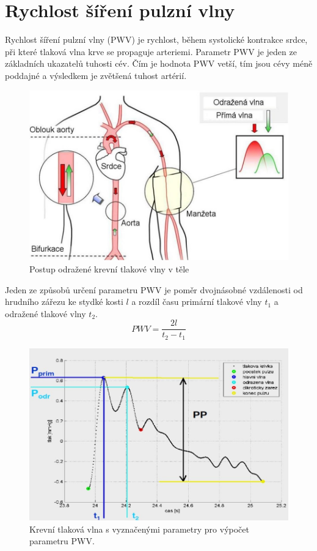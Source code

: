 \section{Rychlost šíření pulzní vlny}
Rychlost šíření pulzní vlny (PWV) je rychlost, během systolické kontrakce srdce, při které tlaková vlna krve se propaguje arteriemi. Parametr PWV je jeden ze základních ukazatelů tuhosti cév.
Čím je hodnota PWV vetší, tím jsou cévy méně poddajné a výsledkem je zvětšená tuhost artérií.\cite{cite:6}
\begin{figure}[H]
    \caption{Postup odražené krevní tlakové vlny v těle \cite{cite:5}}
    \includegraphics[width=1\textwidth]{pictures/pwv_body.jpg}
\end{figure}
Jeden ze způsobů určení parametru PWV je poměr dvojnásobné vzdálenosti od hrudního zářezu ke stydké kosti $l$ a rozdíl času primární tlakové vlny $t_1$ a odražené tlakové vlny $t_2$.
\begin{equation} \label{eq:pwv}
    PWV = \frac{2l}{t_2 - t_1}
\end{equation}
\begin{figure}[H]
    \caption{Krevní tlaková vlna s vyznačenými parametry pro výpočet parametru PWV. \cite{cite:7}}
    \includegraphics[width=1\textwidth]{pictures/pwv_pressure_wave.jpg}
\end{figure}
